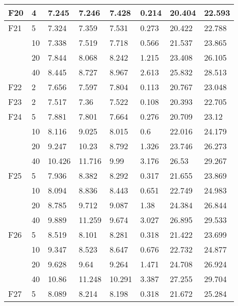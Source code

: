 \begin{longtable}{|l|l|l|l|l|l|l|l|}
F20      & 4   & 7.245   & 7.246  & 7.428   & 0.214  & 20.404  & 22.593  \\ \midrule
F21      & 5   & 7.324   & 7.359  & 7.531   & 0.273  & 20.422  & 22.788  \\ \cmidrule{2-8}
            & 10  & 7.338   & 7.519  & 7.718   & 0.566  & 21.537  & 23.865  \\ \cmidrule{2-8}
            & 20  & 7.844   & 8.068  & 8.242   & 1.215  & 23.408  & 26.105  \\ \cmidrule{2-8}
            & 40  & 8.445   & 8.727  & 8.967   & 2.613  & 25.832  & 28.513  \\ \midrule
F22      & 2   & 7.656   & 7.597  & 7.804   & 0.113  & 20.767  & 23.048  \\ \midrule
F23      & 2   & 7.517   & 7.36   & 7.522   & 0.108  & 20.393  & 22.705  \\ \midrule
F24      & 5   & 7.881   & 7.801  & 7.664   & 0.276  & 20.709  & 23.12   \\ \cmidrule{2-8}
            & 10  & 8.116   & 9.025  & 8.015   & 0.6    & 22.016  & 24.179  \\ \cmidrule{2-8}
            & 20  & 9.247   & 10.23  & 8.792   & 1.326  & 23.746  & 26.273  \\ \cmidrule{2-8}
            & 40  & 10.426  & 11.716 & 9.99    & 3.176  & 26.53   & 29.267  \\ \midrule
F25      & 5   & 7.936   & 8.382  & 8.292   & 0.317  & 21.655  & 23.869  \\ \cmidrule{2-8}
            & 10  & 8.094   & 8.836  & 8.443   & 0.651  & 22.749  & 24.983  \\ \cmidrule{2-8}
            & 20  & 8.785   & 9.712  & 9.087   & 1.38   & 24.384  & 26.844  \\ \cmidrule{2-8}
            & 40  & 9.889   & 11.259 & 9.674   & 3.027  & 26.895  & 29.533  \\ \midrule
F26      & 5   & 8.519   & 8.101  & 8.281   & 0.318  & 21.422  & 23.699  \\ \cmidrule{2-8}
            & 10  & 9.347   & 8.523  & 8.647   & 0.676  & 22.732  & 24.877  \\ \cmidrule{2-8}
            & 20  & 9.628   & 9.64   & 9.264   & 1.471  & 24.708  & 26.924  \\ \cmidrule{2-8}
            & 40  & 10.86   & 11.248 & 10.291  & 3.387  & 27.255  & 29.704  \\ \midrule
F27      & 5   & 8.089   & 8.214  & 8.198   & 0.318  & 21.672  & 25.284  \\ \cmidrule{2-8}

\end{longtable}
